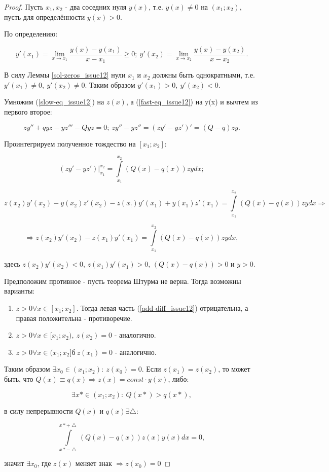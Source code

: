 \begin{proof}
Пусть $x_1, x_2$ - два соседних нуля $y(x)$, т.е. $y(x) \neq 0$ на $(x_1;x_2)$, пусть для определённости $y(x) > 0$.

По определению:

\[y'(x_1) = \lim\limits_{x\rightarrow x_1} \frac{y(x) - y(x_1)}{x - x_1} \geq 0; \: y'(x_2) = \lim\limits_{x\rightarrow x_2} \frac{y(x) - y(x_2)}{x - x_2}.\]

В силу Леммы \ref{sol-zeros_issue12} нули $x_1$ и $x_2$ должны быть однократными, т.е. $y'(x_1) \neq 0, \: y'(x_2) \neq 0$. Таким образом $y'(x_1) > 0, \: y'(x_2) < 0$.

Умножим (\ref{slow-eq_issue12}) на $z(x)$, а (\ref{fast-eq_issue12}) на y(x) и вычтем из первого второе:

\[zy'' + qyz - yz''' - Qyz = 0; \: zy'' - yz'' = (zy'-yz')' = (Q - q)zy.\]

Проинтегрируем полученное тождество на $[x_1;x_2]$:

\[(zy' - yz')\Big\vert_{x_1}^{x_2} = \int\limits_{x_1}^{x_2} (Q(x) - q(x))zydx;\]

\[z(x_2)y'(x_2) - y(x_2)z'(x_2) - z(x_!)y'(x_1) + y(x_1)z'(x_1) = \int\limits_{x_1}^{x_2}(Q(x) - q(x))zydx \Rightarrow\]

\begin{equation}\label{add-diff_issue12} %
\Rightarrow z(x_2)y'(x_2) - z(x_1)y'(x_1) = \int\limits_{x_1}^{x_2}(Q(x) - q(x))zydx,
\end{equation}

здесь $z(x_2)y'(x_2) < 0$, $z(x_1)y'(x_1) > 0$, $(Q(x) - q(x)) > 0$ и $y > 0$.

Предположим противное - пусть теорема Штурма не верна. Тогда возможны варианты:

\begin{enumerate}
\item $z > 0 \forall x \in [x_1;x_2].$ Тогда левая часть (\ref{add-diff_issue12}) отрицательна, а правая положительна - противоречие.

\item $z > 0 \forall x \in [x_1;x_2), \: z(x_2) = 0$ - аналогично.

\item $z > 0 \forall x \in (x_1;x_2]б \: z(x_1) = 0$ - аналогично.
\end{enumerate}

Таким образом $\exists x_0 \in (x_1;x_2): \: z(x_0) = 0$. Если $z(x_1) = z(x_2)$, то может быть, что $Q(x) \equiv q(x) \Rightarrow z(x) = const \cdot y(x)$, либо:

\[\exists x* \in (x_1;x_2): \: Q(x*) > q(x*),\]

в силу непрерывности $Q(x)$ и $q(x) \exists \bigtriangleup:$

\[\int\limits_{x* -\bigtriangleup}^{x* + \bigtriangleup} (Q(x) - q(x))z(x)y(x)dx = 0,\]

значит $\exists x_0$, где $z(x)$ меняет знак $\Rightarrow z(x_0) = 0$
\end{proof}

